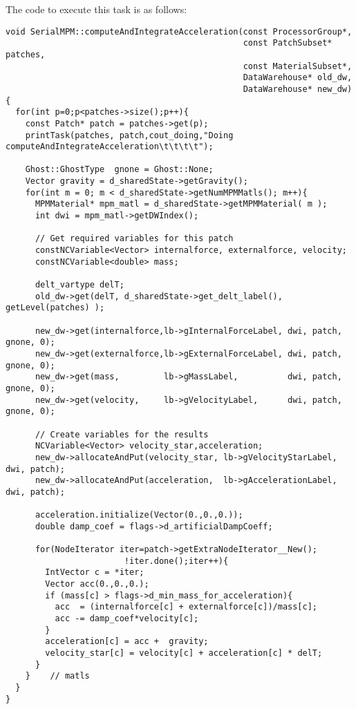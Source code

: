 The code to execute this task is as follows:

\begin{Verbatim}[fontsize=\footnotesize]
void SerialMPM::computeAndIntegrateAcceleration(const ProcessorGroup*,
                                                const PatchSubset* patches,
                                                const MaterialSubset*,
                                                DataWarehouse* old_dw,
                                                DataWarehouse* new_dw)
{
  for(int p=0;p<patches->size();p++){
    const Patch* patch = patches->get(p);
    printTask(patches, patch,cout_doing,"Doing computeAndIntegrateAcceleration\t\t\t\t");

    Ghost::GhostType  gnone = Ghost::None;
    Vector gravity = d_sharedState->getGravity();
    for(int m = 0; m < d_sharedState->getNumMPMMatls(); m++){
      MPMMaterial* mpm_matl = d_sharedState->getMPMMaterial( m );
      int dwi = mpm_matl->getDWIndex();

      // Get required variables for this patch
      constNCVariable<Vector> internalforce, externalforce, velocity;
      constNCVariable<double> mass;

      delt_vartype delT;
      old_dw->get(delT, d_sharedState->get_delt_label(), getLevel(patches) );

      new_dw->get(internalforce,lb->gInternalForceLabel, dwi, patch, gnone, 0);
      new_dw->get(externalforce,lb->gExternalForceLabel, dwi, patch, gnone, 0);
      new_dw->get(mass,         lb->gMassLabel,          dwi, patch, gnone, 0);
      new_dw->get(velocity,     lb->gVelocityLabel,      dwi, patch, gnone, 0);

      // Create variables for the results
      NCVariable<Vector> velocity_star,acceleration;
      new_dw->allocateAndPut(velocity_star, lb->gVelocityStarLabel, dwi, patch);
      new_dw->allocateAndPut(acceleration,  lb->gAccelerationLabel, dwi, patch);

      acceleration.initialize(Vector(0.,0.,0.));
      double damp_coef = flags->d_artificialDampCoeff;

      for(NodeIterator iter=patch->getExtraNodeIterator__New();
                        !iter.done();iter++){
        IntVector c = *iter;
        Vector acc(0.,0.,0.);
        if (mass[c] > flags->d_min_mass_for_acceleration){
          acc  = (internalforce[c] + externalforce[c])/mass[c];
          acc -= damp_coef*velocity[c];
        }
        acceleration[c] = acc +  gravity;
        velocity_star[c] = velocity[c] + acceleration[c] * delT;
      }
    }    // matls
  }
}
\end{Verbatim}

